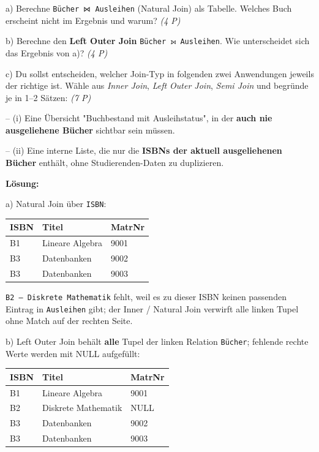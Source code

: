 \documentclass[11pt, a4paper]{article}
\begin{document}
a) Berechne \texttt{Bücher ⋈ Ausleihen} (Natural Join) als Tabelle. Welches Buch erscheint nicht im Ergebnis und warum? \textit{(4 P)}

b) Berechne den \textbf{Left Outer Join} \texttt{Bücher ⟕ Ausleihen}. Wie unterscheidet sich das Ergebnis von a)? \textit{(4 P)}

c) Du sollst entscheiden, welcher Join-Typ in folgenden zwei Anwendungen jeweils der richtige ist. Wähle aus \textit{Inner Join}, \textit{Left Outer Join}, \textit{Semi Join} und begründe je in 1–2 Sätzen: \textit{(7 P)}

– (i) Eine Übersicht "Buchbestand mit Ausleihstatus", in der \textbf{auch nie ausgeliehene Bücher} sichtbar sein müssen.

– (ii) Eine interne Liste, die nur die \textbf{ISBNs der aktuell ausgeliehenen Bücher} enthält, ohne Studierenden-Daten zu duplizieren.


\textbf{Lösung:}


a) Natural Join über \texttt{ISBN}:



{\small
\begin{tabularx}{\linewidth}{XXX}
\hline
\rowcolor{tableheadbg}
{\color{white}\textbf{ISBN}} & {\color{white}\textbf{Titel}} & {\color{white}\textbf{MatrNr}} \\[2pt]
\hline
\endhead
\hline
\endfoot
B1 & Lineare Algebra & 9001 \\
B3 & Datenbanken & 9002 \\
B3 & Datenbanken & 9003 \\
\end{tabularx}
}


\texttt{B2 — Diskrete Mathematik} fehlt, weil es zu dieser ISBN keinen passenden Eintrag in \texttt{Ausleihen} gibt; der Inner / Natural Join verwirft alle linken Tupel ohne Match auf der rechten Seite.


b) Left Outer Join behält \textbf{alle} Tupel der linken Relation \texttt{Bücher}; fehlende rechte Werte werden mit NULL aufgefüllt:



{\small
\begin{tabularx}{\linewidth}{XXX}
\hline
\rowcolor{tableheadbg}
{\color{white}\textbf{ISBN}} & {\color{white}\textbf{Titel}} & {\color{white}\textbf{MatrNr}} \\[2pt]
\hline
\endhead
\hline
\endfoot
B1 & Lineare Algebra & 9001 \\
B2 & Diskrete Mathematik & NULL \\
B3 & Datenbanken & 9002 \\
B3 & Datenbanken & 9003 \\
\end{tabularx}
}
\end{document}
